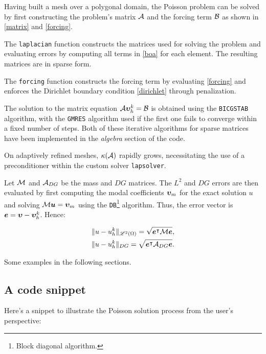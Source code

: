 Having built a mesh over a polygonal domain, the Poisson problem can be solved by first constructing the problem's matrix $\mathcal{A}$ and the forcing term $\mathcal{B}$ as shown in \eqref{matrix} and \eqref{forcing}.

The \lstinline{laplacian} function constructs the matrices used for solving the problem and evaluating errors by computing all terms in \eqref{boa} for each element. The resulting matrices are in sparse form.

The \lstinline{forcing} function constructs the forcing term by evaluating \eqref{forcing} and enforces the Dirichlet boundary condition \eqref{dirichlet} through penalization.

\cite{Saad2003} The solution to the matrix equation $\mathcal{A} \bm{\upsilon}^k_h = \mathcal{B}$ is obtained using the \lstinline{BICGSTAB} algorithm, with the \lstinline{GMRES} algorithm used if the first one fails to converge within a fixed number of steps. Both of these iterative algorithms for sparse matrices have been implemented in the \textit{algebra} section of the code.

On adaptively refined meshes, $\kappa(\mathcal{A})$ rapidly grows, necessitating the use of a preconditioner within the custom solver \lstinline{lapsolver}.

Let $\mathcal{M}$ and $\mathcal{A}_{DG}$ be the mass and $DG$ matrices. The $L^2$ and $DG$ errors are then evaluated by first computing the modal coefficients $\bm{\upsilon}_m$ for the exact solution $u$ and solving $\mathcal{M} \bm{u} = \bm{\upsilon}_m$ using the \lstinline{DB}\footnote{Block diagonal algorithm.} algorithm. Thus, the error vector is $\bm{e} = \bm{\upsilon} - \bm{\upsilon}^k_h$. Hence:

\begin{gather}
    \lVert u - u^k_h \rVert_{\mathscr{L}^2(\Omega)} = \sqrt{\bm{e}^\intercal \mathcal{M} \bm{e}}, \\
    \lVert u - u^k_h \rVert_{DG} = \sqrt{\bm{e}^\intercal \mathcal{A}_{DG} \bm{e}}.
\end{gather}

Some examples in the following sections.

\newpage
\subsection{A code snippet}

Here's a snippet to illustrate the Poisson solution process from the user's perspective:

